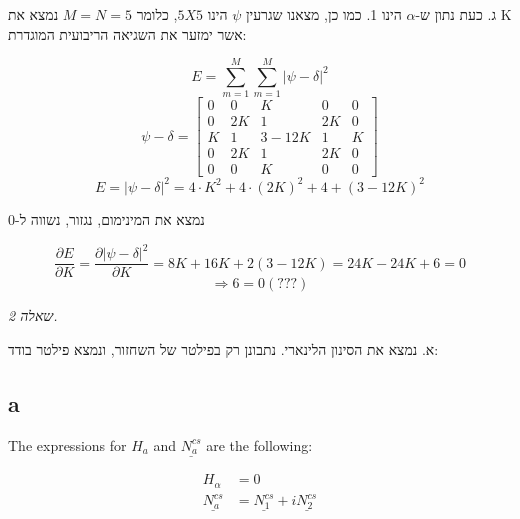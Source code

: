\documentclass[a4paper]{iacas}
\begin{document}
\begin{hebrew}
ג. כעת נתון ש-$\alpha$ הינו 1. כמו כן, מצאנו שגרעין $\psi$ הינו $5X5$, כלומר $M=N=5$ נמצא את K אשר ימזער את השגיאה הריבועית המוגדרת:
\end{hebrew}
\begin{equation*}
E = \sum_{m=1}^M \sum_{m=1}^M |\psi -\delta|^2
\end{equation*}
\begin{equation*}
\psi -\delta  = \begin{bmatrix}0&0&K&0&0\\0&2K&1&2K&0\\K&1&3-12K&1&K\\0&2K&1&2K&0\\0&0&K&0&0\end{bmatrix}
\end{equation*}
\begin{equation*}
E = |\psi -\delta|^2 = 4\cdot K^2 + 4\cdot (2K)^2 + 4 + (3-12K)^2
\end{equation*}
\begin{hebrew}
נמצא את המינימום, נגזור, נשווה ל-0
\end{hebrew}
\begin{equation*}
\frac{\partial E}{\partial K} = \frac{\partial{|\psi -\delta|^2}}{\partial K} = 8K + 16K + 2(3-12K) = 24K -24K + 6 = 0
\end{equation*}
\begin{equation*}
\Longrightarrow 6 = 0 (???)
\end{equation*}



\newpage
\begin{hebrew}
\textit{\huge שאלה 2.}

א. נמצא את הסינון הלינארי. נתבונן רק בפילטר של השחזור, ונמצא פילטר בודד:
\end{hebrew}

\newcommand{\NAcs}{\underline{N_a^{cs}}}
\newcommand{\Nrcs}{\underline{N_1^{cs}}}
\newcommand{\Nics}{\underline{N_2^{cs}}}


\subsection{a}
The expressions for $H_a$ and $\underline{N_a^{cs}}$ are the following:

\begin{align*}
H_\alpha &= 0 \\
\NAcs &= \Nrcs + i\Nics
\end{align*}
\end{document}

